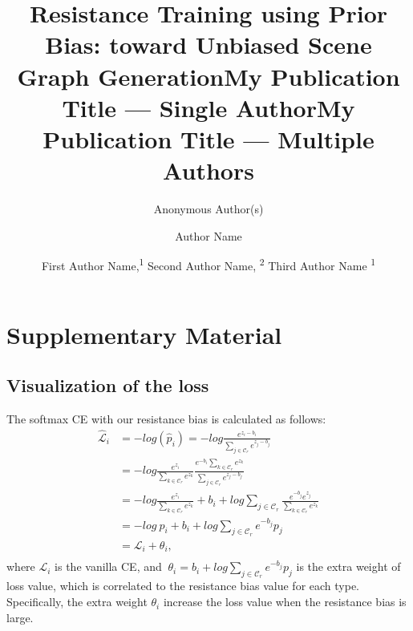 \documentclass[letterpaper]{article} %
\title{Resistance Training using Prior Bias: toward Unbiased Scene Graph Generation}
\author{Anonymous Author(s)}
\author{
}
\title{My Publication Title --- Single Author}
\author {
	Author Name
}
\title{My Publication Title --- Multiple Authors}
\author {
	First Author Name,\textsuperscript{\rm 1}
	Second Author Name, \textsuperscript{\rm 2}
	Third Author Name \textsuperscript{\rm 1}
}
\begin{document}

\section{Supplementary Material}
\subsection{Visualization of the loss}
The softmax CE with our resistance bias is calculated as follows:
\begin{align}
    \mathcal{\hat{L}}_i 
	& = -log(\hat{p}_i)
		  = -log \frac{e^{z_{i} - b_{i}}}{\sum_{j\in \mathcal{C}_r}e^{z_{j} - b_{j}}}
    \nonumber\\
    & = -log \frac{e^{z_i}}{\sum_{k\in \mathcal{C}_r}e^{z_k}} \frac{e^{-b_{i}}{\sum_{k\in \mathcal{C}_r}e^{z_k}}}{\sum_{j\in \mathcal{C}_r}e^{z_j-b_{j}}}\nonumber\\
	& = -log \frac{e^{z_i}}{\sum_{k\in \mathcal{C}_r}e^{z_k}} + b_i + log \sum_{j\in\mathcal{C}_r}\frac{e^{-b_j}e^{z_j}}{\sum_{k\in \mathcal{C}_r}e^{z_k}} 
	\nonumber\\
	& = -log~p_i + b_i + log \sum_{j\in\mathcal{C}_r}{e^{-b_j}p_j} \nonumber\\
	& = \mathcal{L}_i + \theta_{i}, \label{eq:biasloss}\nonumber\\
\end{align}
where $\mathcal{L}_i$ is the vanilla CE, and $~ \theta_{i}  =  b_{i}  + log \sum_{j\in \mathcal{C}_r}e^{-b_{j}}p_j$ is the extra weight of loss value, which is correlated to the resistance bias value for each type. Specifically, the extra weight $\theta_i$ increase the loss value when the resistance bias is large. 
\end{document}
